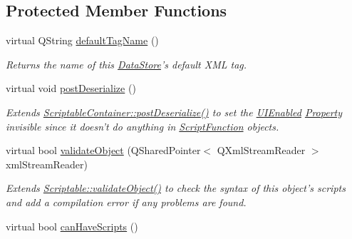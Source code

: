 \subsection*{Protected Member Functions}
\begin{DoxyCompactItemize}
\item 
virtual Q\-String \hyperlink{class_picto_1_1_script_function_aa2718851ab93401f5efdf6f70df199d0}{default\-Tag\-Name} ()
\begin{DoxyCompactList}\small\item\em Returns the name of this \hyperlink{class_picto_1_1_data_store}{Data\-Store}'s default X\-M\-L tag. \end{DoxyCompactList}\item 
\hypertarget{class_picto_1_1_script_function_a76b4da99c2e46834bc975240f81dee68}{virtual void \hyperlink{class_picto_1_1_script_function_a76b4da99c2e46834bc975240f81dee68}{post\-Deserialize} ()}\label{class_picto_1_1_script_function_a76b4da99c2e46834bc975240f81dee68}

\begin{DoxyCompactList}\small\item\em Extends \hyperlink{class_picto_1_1_scriptable_container_a0654af2c08f9a6c967a21b57614950ba}{Scriptable\-Container\-::post\-Deserialize()} to set the \hyperlink{class_picto_1_1_u_i_enabled}{U\-I\-Enabled} \hyperlink{class_picto_1_1_property}{Property} invisible since it doesn't do anything in \hyperlink{class_picto_1_1_script_function}{Script\-Function} objects. \end{DoxyCompactList}\item 
\hypertarget{class_picto_1_1_script_function_a4bd4e7f351bc78806730173f6586e565}{virtual bool \hyperlink{class_picto_1_1_script_function_a4bd4e7f351bc78806730173f6586e565}{validate\-Object} (Q\-Shared\-Pointer$<$ Q\-Xml\-Stream\-Reader $>$ xml\-Stream\-Reader)}\label{class_picto_1_1_script_function_a4bd4e7f351bc78806730173f6586e565}

\begin{DoxyCompactList}\small\item\em Extends \hyperlink{class_picto_1_1_scriptable_ab6e2944c43a3b5d418bf7b251594386d}{Scriptable\-::validate\-Object()} to check the syntax of this object's scripts and add a compilation error if any problems are found. \end{DoxyCompactList}\item 
\hypertarget{class_picto_1_1_script_function_a744c4dfcb105c84fc1d0799b0aa1140e}{virtual bool \hyperlink{class_picto_1_1_script_function_a744c4dfcb105c84fc1d0799b0aa1140e}{can\-Have\-Scripts} ()}\label{class_picto_1_1_script_function_a744c4dfcb105c84fc1d0799b0aa1140e}


\end{DoxyCompactItemize}
